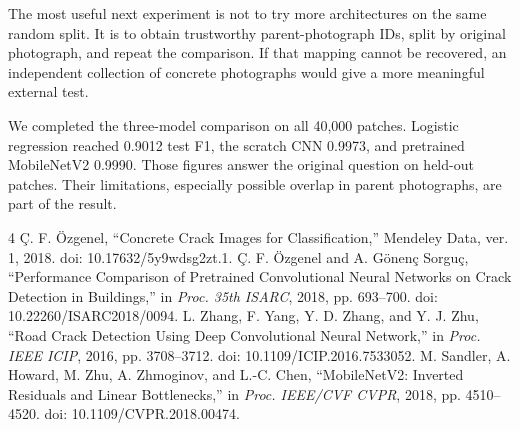 \documentclass[conference,letterpaper]{IEEEtran}
\begin{document}
The most useful next experiment is not to try more architectures on the same random split. It is to obtain trustworthy parent-photograph IDs, split by original photograph, and repeat the comparison. If that mapping cannot be recovered, an independent collection of concrete photographs would give a more meaningful external test.

We completed the three-model comparison on all 40,000 patches. Logistic regression reached 0.9012 test F1, the scratch CNN 0.9973, and pretrained MobileNetV2 0.9990. Those figures answer the original question on held-out patches. Their limitations, especially possible overlap in parent photographs, are part of the result.

\clearpage
\begin{thebibliography}{4}
 \c{C}. F. \"Ozgenel, ``Concrete Crack Images for Classification,'' Mendeley Data, ver. 1, 2018. doi: 10.17632/5y9wdsg2zt.1.
 \c{C}. F. \"Ozgenel and A. G\"onen\c{c} Sorgu\c{c}, ``Performance Comparison of Pretrained Convolutional Neural Networks on Crack Detection in Buildings,'' in \emph{Proc. 35th ISARC}, 2018, pp. 693--700. doi: 10.22260/ISARC2018/0094.
 L. Zhang, F. Yang, Y. D. Zhang, and Y. J. Zhu, ``Road Crack Detection Using Deep Convolutional Neural Network,'' in \emph{Proc. IEEE ICIP}, 2016, pp. 3708--3712. doi: 10.1109/ICIP.2016.7533052.
 M. Sandler, A. Howard, M. Zhu, A. Zhmoginov, and L.-C. Chen, ``MobileNetV2: Inverted Residuals and Linear Bottlenecks,'' in \emph{Proc. IEEE/CVF CVPR}, 2018, pp. 4510--4520. doi: 10.1109/CVPR.2018.00474.
\end{thebibliography}
\end{document}
